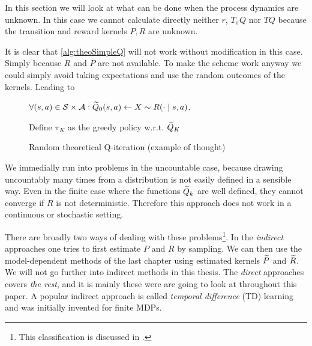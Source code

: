 
In this section we will look at what can be done when the process dynamics
are unknown.
In this case we cannot calculate directly neither $r$, $T_\pi Q$ nor
$TQ$ because the transition and reward kernels $P,R$ are unknown.

It is clear that \cref{alg:theoSimpleQ} will not work without
modification in this case. Simply because $R$ and $P$ are not
available.
To make the scheme work anyway we could simply avoid taking expectations
and use the random outcomes of the kernels.
Leading to

\begin{figure}[H]
\begin{algorithm}[H] %
  \caption{Random theoretical Q-iteration (example of thought)}
$\forall (s, a) \in \mathcal{S} \times \mathcal{A} :
\widetilde{Q}_0(s, a) \leftarrow X \sim R(\cdot \mid s, a)$.

Define $\pi_K$ as the greedy policy w.r.t. $\widetilde{Q}_K$ \\
\label{alg:theoRandomQ}
\end{algorithm}
\end{figure}
We immedially run into problems in the uncountable case, because
drawing uncountably many times from a distribution is not easily
defined in a sensible way.
Even in the finite case where the functions $\widetilde{Q}_k$
are well defined, they cannot converge if $R$ is not deterministic.
Therefore this approach does not work in a continuous or
stochastic setting.

There are broadly two ways of dealing with these
problems\footnote{This classification is discussed in .}.
In the \emph{indirect} approaches one tries to first estimate $P$ and $R$
by sampling.
We can then use the model-dependent methods of the last chapter using
estimated kernels $\widetilde{P}$ and $\widetilde{R}$.
We will not go further into indirect methods in this thesis.
The \emph{direct} approaches covers \emph{the rest},
and it is mainly these were are going to look at throughout this
paper. A popular indirect approach is called
\emph{temporal difference} (TD) learning and was initially invented 
for finite MDPs.

